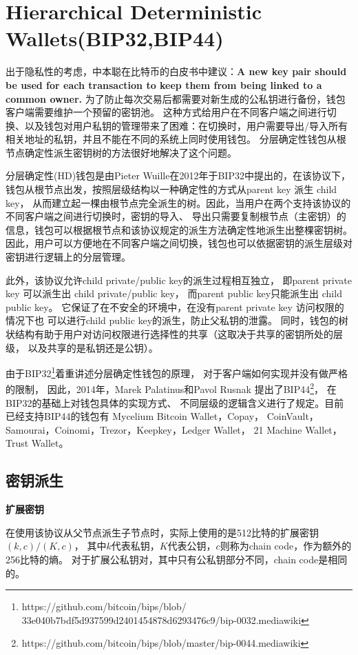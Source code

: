 \section{Hierarchical Deterministic Wallets(BIP32,BIP44)}

出于隐私性的考虑，中本聪在比特币的白皮书中建议：\textbf{A new key pair should be used 
for each transaction to keep them from being linked to a common owner.} 
为了防止每次交易后都需要对新生成的公私钥进行备份，钱包客户端需要维护一个预留的密钥池。
这种方式给用户在不同客户端之间进行切换、以及钱包对用户私钥的管理带来了困难：在切换时，用户需要导出/导入所有相关地址的私钥，并且不能在不同的系统上同时使用钱包。
分层确定性钱包从根节点确定性派生密钥树的方法很好地解决了这个问题。

分层确定性(HD)钱包是由Pieter Wuille在2012年于BIP32中提出的，在该协议下，
钱包从根节点出发，按照层级结构以一种确定性的方式从parent key 派生 child key，
从而建立起一棵由根节点完全派生的树。因此，当用户在两个支持该协议的不同客户端之间进行切换时，密钥的导入、
导出只需要复制根节点（主密钥）的信息，钱包可以根据根节点和该协议规定的派生方法确定性地派生出整棵密钥树。
因此，用户可以方便地在不同客户端之间切换，钱包也可以依据密钥的派生层级对密钥进行逻辑上的分层管理。
  
此外，该协议允许child private/public key的派生过程相互独立，
即parent private key 可以派生出 child private/public key，
而parent public key只能派生出 child public key。
它保证了在不安全的环境中，在没有parent private key 访问权限的情况下也
可以进行child public key的派生，防止父私钥的泄露。
同时，钱包的树状结构有助于用户对访问权限进行选择性的共享（这取决于共享的密钥所处的层级，
以及共享的是私钥还是公钥）。  

由于BIP32\footnote{https://github.com/bitcoin/bips/blob/
33e040b7bdf5d937599d2401454878d6293476c9/bip-0032.mediawiki}着重讲述分层确定性钱包的原理，
对于客户端如何实现并没有做严格的限制，
因此，2014年，Marek Palatinus和Pavol Rusnak 
提出了BIP44\footnote{https://github.com/bitcoin/bips/blob/master/bip-0044.mediawiki}，
在BIP32的基础上对钱包具体的实现方式、 不同层级的逻辑含义进行了规定。目前已经支持BIP44的钱包有
Mycelium Bitcoin Wallet，Copay， CoinVault，Samourai，Coinomi，Trezor，Keepkey，Ledger Wallet，
21 Machine Wallet， Trust Wallet。  

\subsection{密钥派生}

\textbf{扩展密钥}

 在使用该协议从父节点派生子节点时，实际上使用的是512比特的扩展密钥$(k,c)/(K,c)$，
 其中$k$代表私钥，$K$代表公钥，$c$则称为chain code，作为额外的256比特的熵。
 对于扩展公私钥对，其中只有公私钥部分不同，chain code是相同的。
 
